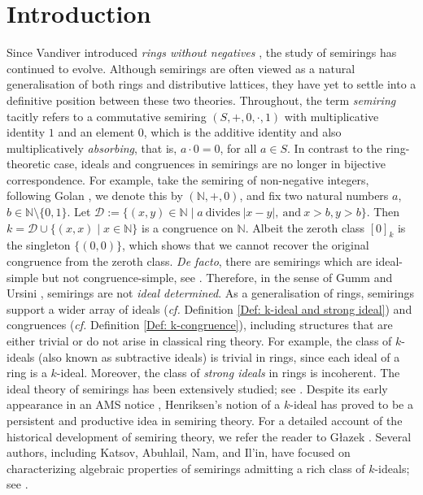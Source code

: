 \documentclass[11pt,english]{amsart}
\theoremstyle{definition}
\numberwithin{equation}{section}
\begin{document}
\section{Introduction} 
Since Vandiver introduced \emph{rings without negatives} \cite{Vandiver34, Vandiver39}, the study of semirings has continued to evolve. Although semirings are often viewed as a natural generalisation of both rings and distributive lattices, they have yet to settle into a definitive position between these two theories.
Throughout, the term \emph{semiring} tacitly refers to a commutative semiring $(S,+,0,\cdot,1)$ with multiplicative identity $1$ and an element $0$, which is the additive identity and also multiplicatively \emph{absorbing}, that is, $a\cdot 0=0$, for all $a\in S$. 
In contrast to the ring-theoretic case, ideals and congruences in semirings are no longer in bijective correspondence. For example, take the semiring of non-negative integers, following Golan \cite{Golan}, we denote this by $(\mathds{N},+,0)$, and fix two natural numbers $a$, $b\in \mathds{N}\setminus \{0,1\}$.
Let $\mathcal{D}:=\{(x,y)\in \mathds{N}\mid a\ \text{divides}\ |x-y|,\ \text{and}\ x>b,y>b\}$. Then $k=\mathcal{D}\cup \{(x,x)\mid x\in \mathds{N}\}$ is a congruence on $\mathds{N}$. Albeit the zeroth class $[0]_k$ is the singleton $\{(0,0)\}$, which shows that we cannot recover the original congruence from the zeroth class. \emph{De facto}, there are semirings which are ideal-simple but not congruence-simple, see \cite[Section 2]{Nam21}.  Therefore, in the sense of Gumm and Ursini \cite{GummUrsini}, semirings are not \emph{ideal determined}. As a generalisation of rings, semirings support a wider array of ideals (\textit{cf.} Definition \ref{Def: k-ideal and strong ideal}) and congruences (\textit{cf.} Definition \ref{Def: k-congruence}), including structures that are either trivial or do not arise in classical ring theory. For example, the class of $k$-ideals (also known as subtractive ideals) is trivial in rings, since each ideal of a ring is a $k$-ideal. Moreover, the class of \emph{strong ideals} in rings is incoherent. The ideal theory of semirings has been extensively studied; see \cite{Atani08, AtaniGarfami13, Nasehpour19, Iseki56, LaGrassa95, Goswami23, Goswami25, GoswamiDube24, GoswamiMaatallah25, BiswasBagSardarFilomat24}.
Despite its early appearance in an AMS notice \cite{Henriksen58}, Henriksen’s notion of a $k$-ideal has proved to be a persistent and productive idea in semiring theory. For a detailed account of the historical development of semiring theory, we refer the reader to G\l azek \cite{Glazek02}. Several authors, including Katsov, Abuhlail, Nam, and Il'in, have focused on characterizing algebraic properties of semirings admitting a rich class of $k$-ideals; see \cite{Il'inKatsovNam17, Abuhlail22, Abuhlail18, Katsov09, Katsov11}.
\end{document}

